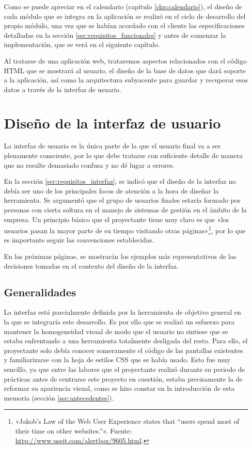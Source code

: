 Como se puede apreciar en el calendario (capítulo \ref{chp:calendario}), el
diseño de cada módulo que se integra en la aplicación se realizó en el ciclo
de desarrollo del propio módulo, una vez que se habían acordado con el cliente
las especificaciones detalladas en la sección \ref{sec:requisitos_funcionales}
y antes de comenzar la implementación, que se verá en el siguiente capítulo.

Al tratarse de una aplicación web, trataremos aspectos relacionados con el
código HTML que se mostrará al usuario, el diseño de la base de datos que dará
soporte a la aplicación, así como la arquitectura subyacente para guardar y
recuperar esos datos a través de la interfaz de usuario.

\section{Diseño de la interfaz de usuario}

La interfaz de usuario es la única parte de la que el usuario final va a ser
plenamente consciente, por lo que debe tratarse con suficiente detalle de
manera que no resulte demasiado confusa y no dé lugar a errores.

En la sección \ref{sec:requisitos_interfaz}, se indicó que el diseño de la
interfaz no debía ser uno de los principales focos de atención a la hora de
diseñar la herramienta. Se argumentó que el grupo de usuarios finales estaría
formado por personas con cierta soltura en el manejo de sistemas de gestión en
el ámbito de la empresa. Un principio básico que el proyectante tiene muy claro
es que «los usuarios pasan la mayor parte de su tiempo visitando otras
páginas»\footnote{«Jakob's Law of the Web User Experience states that ``users
spend most of their time on other websites.''». Fuente:
\href{http://www.useit.com/alertbox/9605.html}{
http://www.useit.com/alertbox/9605.html}.}, por lo que es importante seguir las
convenciones establecidas.

En las próximas páginas, se mostrarán los ejemplos más representativos de las
decisiones tomadas en el contexto del diseño de la interfaz.

\subsection{Generalidades}

La interfaz está parcialmente definida por la herramienta de objetivo general en
la que se integraría este desarrollo. Es por ello que se realizó un esfuerzo
para mantener la homogeneidad visual de modo que el usuario no sintiese que se
estaba enfrentando a una herramienta totalmente desligada del resto. Para ello,
el proyectante solo debía conocer someramente el código de las pantallas
existentes y familiarizarse con la hoja de estilos CSS que se había usado. Esto
fue muy sencillo, ya que entre las labores que el proyectante realizó durante su
periodo de prácticas antes de centrarse este proyecto en cuestión, estaba
precisamente la de reformar su apariencia visual, como se hizo constar en la
introducción de esta memoria (sección \ref{sec:antecedentes}).

